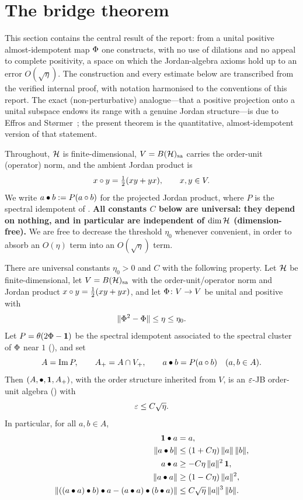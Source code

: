 \section{The bridge theorem}\label{sec:bridge}

This section contains the central result of the report: from a unital positive
almost-idempotent map $\Phi$ one constructs, with no use of dilations and no
appeal to complete positivity, a space on which the Jordan-algebra axioms hold
up to an error $O(\sqrt\eta)$. The construction and every estimate below are
transcribed from the verified internal proof, with notation harmonised to the
conventions of this report. The exact (non-perturbative) analogue---that a
positive projection onto a unital subspace endows its range with a genuine
Jordan structure---is due to Effros and St{\o}rmer~\cite{EffrosStormer1979};
the present theorem is the quantitative, almost-idempotent version of that
statement.

Throughout, $\mathcal{H}$ is finite-dimensional, $V=B(\mathcal{H})_{\mathrm{sa}}$ carries the order-unit
(operator) norm, and the ambient Jordan product is
\[
  x\circ y=\tfrac12(xy+yx),\qquad x,y\in V .
\]
We write $a\bullet b:=P(a\circ b)$ for the projected Jordan product, where $P$ is
the spectral idempotent of . \textbf{All constants $C$ below
are universal: they depend on nothing, and in particular are independent of
$\dim\mathcal{H}$ (dimension-free).} We are free to decrease the threshold $\eta_0$
whenever convenient, in order to absorb an $O(\eta)$ term into an
$O(\sqrt\eta)$ term.

\begin{theorem}\label{thm:bridge}
There are universal constants $\eta_0>0$ and $C$ with the following property.
Let $\mathcal{H}$ be finite-dimensional, let $V=B(\mathcal{H})_{\mathrm{sa}}$ with the order-unit/operator norm
and Jordan product $x\circ y=\tfrac12(xy+yx)$, and let $\Phi\colon V\to V$ be
unital and positive with
\[
  \lVert \Phi^2-\Phi \rVert\le\eta\le\eta_0 .
\]
Let $P=\theta(2\Phi-\mathbf{1})$ be the spectral idempotent associated to the
spectral cluster of $\Phi$ near $1$ \textup{(}\textup{)},
and set
\[
  A=\operatorname{Im} P,\qquad A_+=A\cap V_+,\qquad a\bullet b=P(a\circ b)\quad(a,b\in A).
\]
Then $(A,\bullet,\mathbf{1},A_+)$, with the order structure inherited from $V$, is an
$\varepsilon$-JB order-unit algebra \textup{(}\textup{)} with
\[
  \varepsilon\le C\sqrt{\eta}.
\]
In particular, for all $a,b\in A$,
\begin{align}
  \mathbf{1}\bullet a&=a, \label{eq:bridge-unit}\\
  \lVert a\bullet b \rVert&\le(1+C\eta)\,\lVert a \rVert\,\lVert b \rVert, \label{eq:bridge-prod}\\
  a\bullet a&\ge-C\eta\,\lVert a \rVert^2\,\mathbf{1}, \label{eq:bridge-posq}\\
  \lVert a\bullet a \rVert&\ge(1-C\eta)\,\lVert a \rVert^2, \label{eq:bridge-normq}\\
  \lVert ((a\bullet a)\bullet b)\bullet a-(a\bullet a)\bullet(b\bullet a) \rVert
    &\le C\sqrt{\eta}\,\lVert a \rVert^3\,\lVert b \rVert. \label{eq:bridge-jordan}
\end{align}
\end{theorem}

